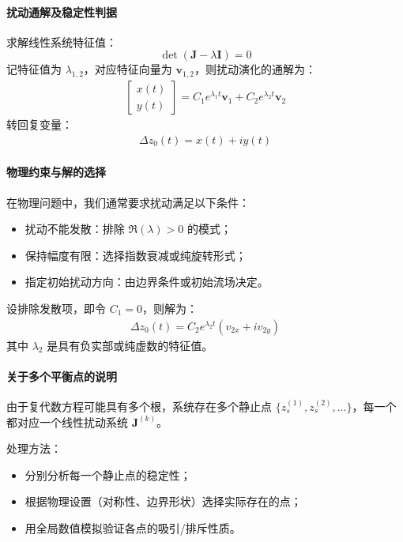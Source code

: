 \paragraph{扰动通解及稳定性判据}

求解线性系统特征值：
\[
\det(\bm{J} - \lambda \bm{I}) = 0
\]
记特征值为 \( \lambda_{1,2} \)，对应特征向量为 \( \bm{v}_{1,2} \)，则扰动演化的通解为：
\begin{align}
    \begin{bmatrix}
        x(t) \\ y(t)
    \end{bmatrix}
    = C_1 e^{\lambda_1 t} \bm{v}_1 + C_2 e^{\lambda_2 t} \bm{v}_2
\end{align}
转回复变量：
\begin{align}
    \Delta z_0(t) = x(t) + i y(t)
\end{align}

\paragraph{物理约束与解的选择}

在物理问题中，我们通常要求扰动满足以下条件：
\begin{itemize}
    \item 扰动不能发散：排除 \( \Re(\lambda) > 0 \) 的模式；
    \item 保持幅度有限：选择指数衰减或纯旋转形式；
    \item 指定初始扰动方向：由边界条件或初始流场决定。
\end{itemize}


设排除发散项，即令 \( C_1 = 0 \)，则解为：
\begin{align}
    \Delta z_0(t) = C_2 e^{\lambda_2 t} (v_{2x} + i v_{2y})
\end{align}
其中 \( \lambda_2 \) 是具有负实部或纯虚数的特征值。

\paragraph{关于多个平衡点的说明}

由于复代数方程可能具有多个根，系统存在多个静止点 \( \{ z_s^{(1)}, z_s^{(2)}, \ldots \} \)，每一个都对应一个线性扰动系统 \( \bm{J}^{(k)} \)。

处理方法：
\begin{itemize}
    \item 分别分析每一个静止点的稳定性；
    \item 根据物理设置（对称性、边界形状）选择实际存在的点；
    \item 用全局数值模拟验证各点的吸引/排斥性质。
\end{itemize}




